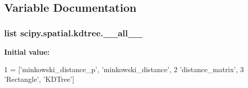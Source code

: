 \subsection{Variable Documentation}
\hypertarget{namespacescipy_1_1spatial_1_1kdtree_a291214a57c5670eae356fc5e16b85247}{}
\subsubsection[{\+\_\+\+\_\+all\+\_\+\+\_\+}]{\setlength{\rightskip}{0pt plus 5cm}list scipy.\+spatial.\+kdtree.\+\_\+\+\_\+all\+\_\+\+\_\+}\label{namespacescipy_1_1spatial_1_1kdtree_a291214a57c5670eae356fc5e16b85247}
{\bfseries Initial value\+:}
\begin{DoxyCode}
1 = [\textcolor{stringliteral}{'minkowski\_distance\_p'}, \textcolor{stringliteral}{'minkowski\_distance'},
2            \textcolor{stringliteral}{'distance\_matrix'},
3            \textcolor{stringliteral}{'Rectangle'}, \textcolor{stringliteral}{'KDTree'}]
\end{DoxyCode}
